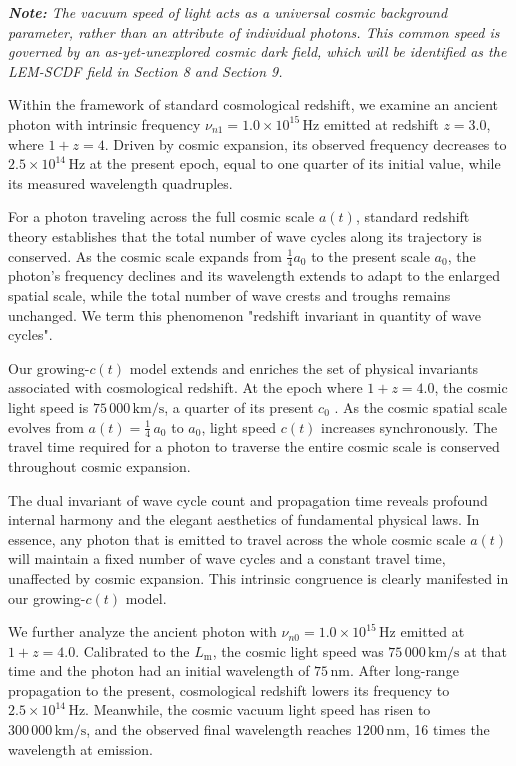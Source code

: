 \documentclass[12pt,leqno]{article}
\begin{document}
	\medskip
	\textit{\textbf{Note:} The vacuum speed of light acts as a universal cosmic background parameter, rather than an attribute of individual photons. This common speed is governed by an as-yet-unexplored cosmic dark field, which will be identified as the LEM-SCDF field in Section 8 and Section 9.}
	
	\medskip
	Within the framework of standard cosmological redshift, we examine an ancient photon with intrinsic frequency $\nu_{n1}=1.0\times 10^{15}\,\mathrm{Hz}$ emitted at redshift $z=3.0$, where $1+z=4$. Driven by cosmic expansion, its observed frequency decreases to $2.5\times 10^{14}\,\mathrm{Hz}$ at the present epoch, equal to one quarter of its initial value, while its measured wavelength quadruples.
	
	\medskip
	For a photon traveling across the full cosmic scale $a(t)$, standard redshift theory establishes that the total number of wave cycles along its trajectory is conserved. As the cosmic scale expands from $\frac{1}{4}a_0$ to the present scale $a_0$, the photon’s frequency declines and its wavelength extends to adapt to the enlarged spatial scale, while the total number of wave crests and troughs remains unchanged. We term this phenomenon "redshift invariant in quantity of wave cycles".
	
	\medskip
	Our growing-$c(t)$ model extends and enriches the set of physical invariants associated with cosmological redshift. At the epoch where $1+z=4.0$, the cosmic light speed is $75\,000\,\mathrm{km/s}$, a quarter of its present $c_0$ . As the cosmic spatial scale evolves from $a(t)=\frac{1}{4}\, a_0$ to $a_0$, light speed $c(t)$ increases synchronously. The travel time required for a photon to traverse the entire cosmic scale is conserved throughout cosmic expansion.
	
	\medskip
	The dual invariant of wave cycle count and propagation time reveals profound internal harmony and the elegant aesthetics of fundamental physical laws. In essence, any photon that is emitted to travel across the whole cosmic scale $a(t)$ will maintain a fixed number of wave cycles and a constant travel time, unaffected by cosmic expansion. This intrinsic congruence is clearly manifested in our growing-$c(t)$ model.
	
	\medskip
	We further analyze the ancient photon with $\nu_{n0}=1.0\times10^{15}\,\mathrm{Hz}$ emitted at $1+z=4.0$. Calibrated to the $L_\mathrm{m}$, the cosmic light speed was $75\,000\,\mathrm{km/s}$ at that time and the photon had an initial wavelength of $75\,\mathrm{nm}$. After long-range propagation to the present, cosmological redshift lowers its frequency to $2.5\times 10^{14}\,\mathrm{Hz}$. Meanwhile, the cosmic vacuum light speed has risen to  $300\,000\, \mathrm{km/s}$, and the observed final wavelength reaches $1200\,\mathrm{nm}$, 16 times the wavelength at emission.
	
\end{document}
